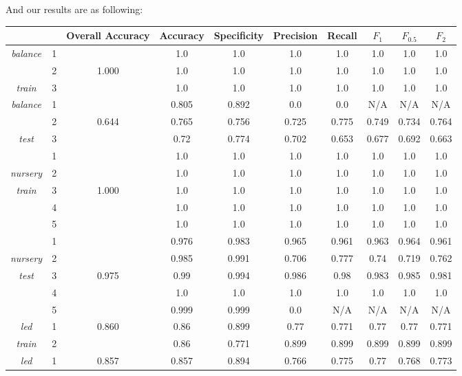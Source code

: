 \documentclass[11pt]{article}
\begin{document}
    And our results are as following:
    \begin{center}
    \begin{longtable}{| c | c | c | c | c | c | c | c | c | c |}
    		\hline
    		 & & Overall Accuracy & Accuracy & Specificity & Precision & Recall & $F_1$ & $F_{0.5}$ & $F_2$\\
    		 \hline
    		 \textit{balance} & 1 &  & 1.0 & 1.0 & 1.0& 1.0& 1.0& 1.0& 1.0\\
    		                  & 2 & 1.000 & 1.0 & 1.0 & 1.0& 1.0& 1.0& 1.0& 1.0\\
    		 \textit{train}	  & 3 &  & 1.0 & 1.0 & 1.0& 1.0& 1.0& 1.0& 1.0\\
    		 \hline
    		 \textit{balance} & 1 &  & 0.805 & 0.892 & 0.0& 0.0& N/A& N/A & N/A\\
    		                  & 2 & 0.644 & 0.765 & 0.756 & 0.725 & 0.775 & 0.749 & 0.734 & 0.764\\
    		 \textit{test}	  & 3 &  & 0.72 & 0.774 & 0.702 & 0.653 & 0.677& 0.692 & 0.663\\
    		 \hline
    		                  & 1 & & 1.0 & 1.0 & 1.0& 1.0& 1.0& 1.0& 1.0\\
    		 \textit{nursery} & 2 & & 1.0 & 1.0 & 1.0& 1.0& 1.0& 1.0& 1.0\\
    		 \textit{train}	  & 3 & 1.000 & 1.0 & 1.0 & 1.0& 1.0& 1.0& 1.0& 1.0\\
    		                  & 4 & & 1.0 & 1.0 & 1.0& 1.0& 1.0& 1.0& 1.0\\
    		                  & 5 & & 1.0 & 1.0 & 1.0& 1.0& 1.0& 1.0& 1.0\\
    		 \hline
    		 				  & 1 & & 0.976 & 0.983 & 0.965 & 0.961 & 0.963 & 0.964 & 0.961\\
    		 \textit{nursery} & 2 & & 0.985 & 0.991 & 0.706& 0.777& 0.74& 0.719& 0.762\\
    		 \textit{test}	  & 3 & 0.975 & 0.99 & 0.994 & 0.986& 0.98& 0.983& 0.985& 0.981\\
    		                  & 4 & & 1.0 & 1.0 & 1.0& 1.0& 1.0& 1.0& 1.0\\
    		                  & 5 & & 0.999 & 0.999 & 0.0& N/A& N/A& N/A& N/A\\
    		 \hline
    		 \textit{led}     & 1 & 0.860 & 0.86 & 0.899 & 0.77& 0.771& 0.77& 0.77& 0.771\\
    		 \textit{train}	  & 2 & & 0.86 & 0.771 & 0.899& 0.899& 0.899& 0.899& 0.899\\
    		 \hline
    		 \textit{led}     & 1 & 0.857&0.857 & 0.894 & 0.766& 0.775& 0.77& 0.768& 0.773\\

\end{longtable}
\end{center}
\end{document}
